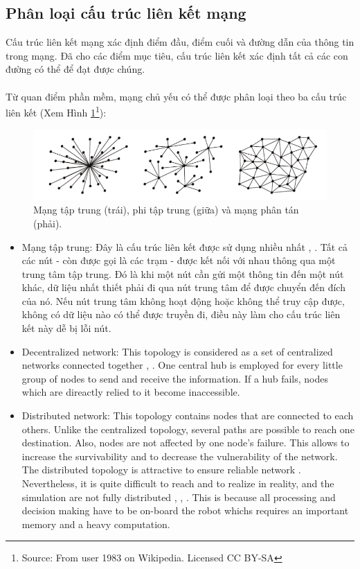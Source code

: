 \documentclass[11pt,openany]{book}
\begin{document}
\begin{algorimth}[H]
\subsection{Phân loại cấu trúc liên kết mạng}
Cấu trúc liên kết mạng xác định điểm đầu, điểm cuối và đường dẫn của thông tin trong mạng. Đã cho các điểm mục tiêu, cấu trúc liên kết xác định tất cả các con đường có thể để đạt được chúng.\\\\
Từ quan điểm phần mềm, mạng chủ yếu có thể được phân loại theo ba cấu trúc liên kết (Xem Hình \ref{fig:4.2}\footnote{Source: From user 1983 on Wikipedia. Licensed CC BY-SA}):
\begin{figure}[H]
    \centering
    \includegraphics[scale=0.4]{assets/4_2.png}
    \caption{Mạng tập trung (trái), phi tập trung (giữa) và mạng phân tán (phải).}
    \label{fig:4.2}
\end{figure}
\begin{itemize}
    \item Mạng tập trung: Đây là cấu trúc liên kết được sử dụng nhiều nhất \cite{morgenthaler2012uavnet}, \cite{forster2013collaborative}. Tất cả các nút - còn được gọi là các trạm - được kết nối với nhau thông qua một trung tâm tập trung. Đó là khi một nút cần gửi một thông tin đến một nút khác, dữ liệu nhất thiết phải đi qua nút trung tâm để được chuyển đến đích của nó. Nếu nút trung tâm không hoạt động hoặc không thể truy cập được, không có dữ liệu nào có thể được truyền đi, điều này làm cho cấu trúc liên kết này dễ bị lỗi nút.
    \item Decentralized network: This topology is considered as a set of centralized networks connected together \cite{konolige2003map}, \cite{brand2014stereo}. One central hub is employed for every little group of nodes to send and receive the information. If a hub fails, nodes which are direactly relied to it become inaccessible.
    \item Distributed network: This topology contains nodes that are connected to each others. Unlike the centralized topology, several paths are possible to reach one destination. Also, nodes are not affected by one node's failure. This allows to increase the survivability and to decrease the vulnerability of the network. The distributed topology is attractive to ensure reliable network \cite{cunningham2010ddf}. Nevertheless, it is quite difficult to reach and to realize in reality, and the simulation are not fully distributed \cite{waharte2009coordinated}, \cite{cameron2009collaborative}, \cite{scherer2015autonomous}. This is because all processing and decision making have to be on-board the robot whichs requires an important memory and a heavy computation.
\end{itemize}

\end{algorimth}
\end{document}
